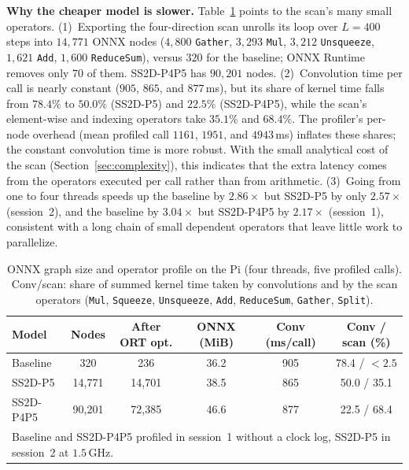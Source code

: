 \textbf{Why the cheaper model is slower.} Table~\ref{tab:graph_profile} points to the scan's many small operators. (1)~Exporting the four-direction scan unrolls its loop over $L = 400$ steps into $14{,}771$ ONNX nodes ($4{,}800$ \texttt{Gather}, $3{,}293$ \texttt{Mul}, $3{,}212$ \texttt{Unsqueeze}, $1{,}621$ \texttt{Add}, $1{,}600$ \texttt{ReduceSum}), versus $320$ for the baseline; ONNX Runtime removes only $70$ of them. SS2D-P4P5 has $90{,}201$ nodes. (2)~Convolution time per call is nearly constant ($905$, $865$, and $877$\,ms), but its share of kernel time falls from $78.4\%$ to $50.0\%$ (SS2D-P5) and $22.5\%$ (SS2D-P4P5), while the scan's element-wise and indexing operators take $35.1\%$ and $68.4\%$. The profiler's per-node overhead (mean profiled call $1161$, $1951$, and $4943$\,ms) inflates these shares; the constant convolution time is more robust. With the small analytical cost of the scan (Section~\ref{sec:complexity}), this indicates that the extra latency comes from the operators executed per call rather than from arithmetic. (3)~Going from one to four threads speeds up the baseline by $2.86\times$ but SS2D-P5 by only $2.57\times$ (session~2), and the baseline by $3.04\times$ but SS2D-P4P5 by $2.17\times$ (session~1), consistent with a long chain of small dependent operators that leave little work to parallelize.

\begin{table}[t]
\caption{ONNX graph size and operator profile on the Pi (four threads, five profiled calls). Conv/scan: share of summed kernel time taken by convolutions and by the scan operators (\texttt{Mul}, \texttt{Squeeze}, \texttt{Unsqueeze}, \texttt{Add}, \texttt{ReduceSum}, \texttt{Gather}, \texttt{Split}).}
\label{tab:graph_profile}
\centering
\footnotesize
\setlength{\tabcolsep}{3.4pt}
\begin{tabular}{lccccc}
\toprule
\textbf{Model} & \textbf{Nodes} & \textbf{After ORT opt.} & \textbf{ONNX (MiB)} & \textbf{Conv (ms/call)} & \textbf{Conv / scan (\%)} \\
\midrule
Baseline & 320 & 236 & 36.2 & 905 & 78.4 / $<2.5$ \\
SS2D-P5 & 14{,}771 & 14{,}701 & 38.5 & 865 & 50.0 / 35.1 \\
SS2D-P4P5 & 90{,}201 & 72{,}385 & 46.6 & 877 & 22.5 / 68.4 \\
\bottomrule
\multicolumn{6}{p{0.92\textwidth}}{\scriptsize Baseline and SS2D-P4P5 profiled in session~1 without a clock log, SS2D-P5 in session~2 at $1.5$\,GHz.} \\
\end{tabular}
\end{table}

